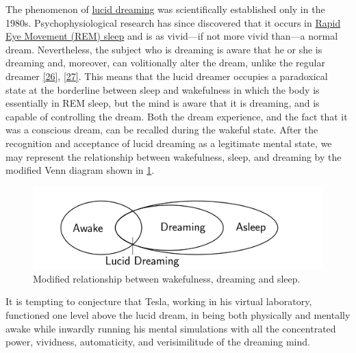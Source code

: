 \documentclass[
  a4paper,
]{article}
\begin{document}
The phenomenon of \href{https://en.wikipedia.org/wiki/Lucid_dream}{lucid
dreaming} was scientifically established only in the 1980s.
Psychophysiological research has since discovered that it occurs in
\href{https://en.wikipedia.org/wiki/Rapid_eye_movement_sleep}{Rapid Eye
Movement (REM) sleep} and is as vivid---if not more vivid than---a
normal dream. Nevertheless, the subject who is dreaming is aware that he
or she is dreaming and, moreover, can volitionally alter the dream,
unlike the regular dreamer \protect\hyperlink{ref-laberge85}{{[}26{]}},
\protect\hyperlink{ref-laberge2000}{{[}27{]}}. This means that the lucid
dreamer occupies a paradoxical state at the borderline between sleep and
wakefulness in which the body is essentially in REM sleep, but the mind
is aware that it is dreaming, and is capable of controlling the dream.
Both the dream experience, and the fact that it was a conscious dream,
can be recalled during the wakeful state. After the recognition and
acceptance of lucid dreaming as a legitimate mental state, we may
represent the relationship between wakefulness, sleep, and dreaming by
the modified Venn diagram shown in \cref{fig:lucid}.

\begin{figure}
\hypertarget{fig:lucid}{%
\centering
\includegraphics[width=1\textwidth,height=\textheight]{images/lucid.svg}
\caption[Modified relationship between wakefulness, dreaming and
sleep.]{Modified relationship between wakefulness, dreaming and
sleep.\footnotemark{}}\label{fig:lucid}
}
\end{figure}

It is tempting to conjecture that Tesla, working in his virtual
laboratory, functioned one level above the lucid dream, in being both
physically and mentally awake while inwardly running his mental
simulations with all the concentrated power, vividness, automaticity,
and verisimilitude of the dreaming mind.
\end{document}
